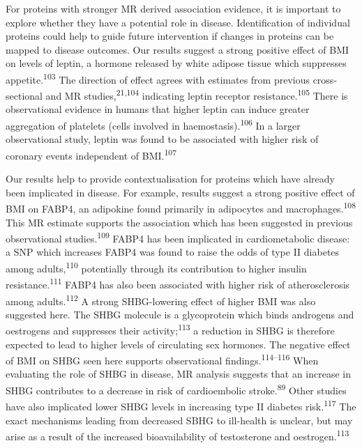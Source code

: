 \documentclass[11pt,twoside]{bristolthesis}
\begin{document}
For proteins with stronger MR derived association evidence, it is important to explore whether they have a potential role in disease. Identification of individual proteins could help to guide future intervention if changes in proteins can be mapped to disease outcomes. Our results suggest a strong positive effect of BMI on levels of leptin, a hormone released by white adipose tissue which suppresses appetite.\textsuperscript{103} The direction of effect agrees with estimates from previous cross-sectional and MR studies,\textsuperscript{21,104} indicating leptin receptor resistance.\textsuperscript{105} There is observational evidence in humans that higher leptin can induce greater aggregation of platelets (cells involved in haemostasis).\textsuperscript{106} In a larger observational study, leptin was found to be associated with higher risk of coronary events independent of BMI.\textsuperscript{107}

Our results help to provide contextualisation for proteins which have already been implicated in disease. For example, results suggest a strong positive effect of BMI on FABP4, an adipokine found primarily in adipocytes and macrophages.\textsuperscript{108} This MR estimate supports the association which has been suggested in previous observational studies.\textsuperscript{109} FABP4 has been implicated in cardiometabolic disease: a SNP which increases FABP4 was found to raise the odds of type II diabetes among adults,\textsuperscript{110} potentially through its contribution to higher insulin resistance.\textsuperscript{111} FABP4 has also been associated with higher risk of atherosclerosis among adults.\textsuperscript{112} A strong SHBG-lowering effect of higher BMI was also suggested here. The SHBG molecule is a glycoprotein which binds androgens and oestrogens and suppresses their activity;\textsuperscript{113} a reduction in SHBG is therefore expected to lead to higher levels of circulating sex hormones. The negative effect of BMI on SHBG seen here supports observational findings.\textsuperscript{114--116} When evaluating the role of SHBG in disease, MR analysis suggests that an increase in SHBG contributes to a decrease in risk of cardioembolic stroke.\textsuperscript{89} Other studies have also implicated lower SHBG levels in increasing type II diabetes risk.\textsuperscript{117} The exact mechanisms leading from decreased SBHG to ill-health is unclear, but may arise as a result of the increased bioavailability of testosterone and oestrogen.\textsuperscript{113}
\end{document}
